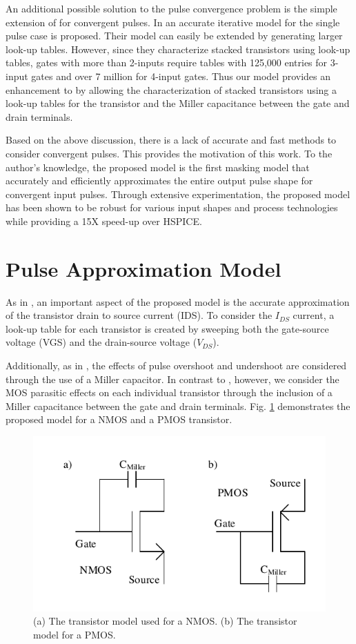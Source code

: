 An additional possible solution to the pulse convergence problem is the simple extension of \cite{Accurate_Masking} for convergent pulses. In \cite{Accurate_Masking} an accurate iterative model for the single pulse case is proposed. Their model can easily be extended by generating larger look-up tables. However, since they characterize stacked transistors using look-up tables, gates with more than 2-inputs require tables with 125,000 entries for 3-input gates and over 7 million for 4-input gates. Thus our model provides an enhancement to \cite{Accurate_Masking} by allowing the characterization of stacked transistors using a look-up tables for the transistor and the Miller capacitance between the gate and drain terminals.

Based on the above discussion, there is a lack of accurate and fast methods to consider convergent pulses.  This provides the motivation of this work. To the author’s knowledge, the proposed model is the first masking model that accurately and efficiently approximates the entire output pulse shape for convergent input pulses. Through extensive experimentation, the proposed model has been shown to be robust for various input shapes and process technologies while providing a 15X speed-up over HSPICE.

\section{Pulse Approximation Model}
As in \cite{Accurate_Masking}, an important aspect of the proposed model is the accurate approximation of the transistor drain to source current (IDS). To consider the $I_{DS}$ current, a look-up table for each transistor is created by sweeping both the gate-source voltage (VGS) and the drain-source voltage ($V_{DS}$).
 
Additionally, as in \cite{Accurate_Masking}, the effects of pulse overshoot and undershoot are considered through the use of a Miller capacitor. In contrast to \cite{Accurate_Masking}, however, we consider the MOS parasitic effects on each individual transistor through the inclusion of a Miller capacitance between the gate and drain terminals. Fig. \ref{TModel} demonstrates the proposed model for a NMOS and a PMOS transistor. 

\begin{figure}[!htbp]
	\centering
	\includegraphics[width=0.50\linewidth]{Figures/TransistorModel}
	\caption{(a) The transistor model used for a NMOS. (b) The transistor model for a PMOS.}
	\label{TModel}
\end{figure}

